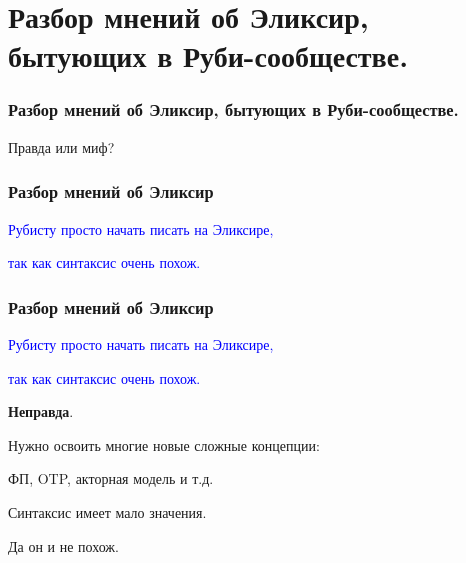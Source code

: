 \documentclass[10pt]{beamer}
\begin{document}
\section{Разбор мнений об Эликсир, бытующих в Руби-сообществе.}

{
\begin{frame}
\frametitle{Разбор мнений об Эликсир, бытующих в Руби-сообществе.}
\centering
Правда или миф?
\end{frame}
}

\begin{frame}
\frametitle{Разбор мнений об Эликсир}
\centering
\textcolor{blue}{Рубисту просто начать писать на Эликсире,}
\par
\textcolor{blue}{так как синтаксис очень похож.}
\end{frame}

\begin{frame}
\frametitle{Разбор мнений об Эликсир}
\centering
\textcolor{blue}{Рубисту просто начать писать на Эликсире,}
\par
\textcolor{blue}{так как синтаксис очень похож.}
\par \bigskip
\textbf{Неправда}.
\par \bigskip
Нужно освоить многие новые сложные концепции:
\par
ФП, OTP, акторная модель и т.д.
\par \bigskip
Синтаксис имеет мало значения.
\par
Да он и не похож.
\end{frame}




\end{document}
